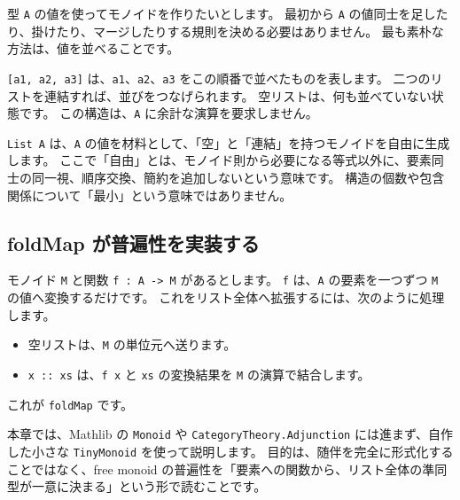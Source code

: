 型 \texttt{A} の値を使ってモノイドを作りたいとします。
最初から \texttt{A} の値同士を足したり、掛けたり、マージしたりする規則を決める必要はありません。
最も素朴な方法は、値を並べることです。

\texttt{[a1, a2, a3]} は、\texttt{a1}、\texttt{a2}、\texttt{a3} をこの順番で並べたものを表します。
二つのリストを連結すれば、並びをつなげられます。
空リストは、何も並べていない状態です。
この構造は、\texttt{A} に余計な演算を要求しません。

\texttt{List A} は、\texttt{A} の値を材料として、「空」と「連結」を持つモノイドを自由に生成します。
ここで「自由」とは、モノイド則から必要になる等式以外に、要素同士の同一視、順序交換、簡約を追加しないという意味です。
構造の個数や包含関係について「最小」という意味ではありません。


\subsection{foldMap が普遍性を実装する}

モノイド \texttt{M} と関数 \texttt{f : A -> M} があるとします。
\texttt{f} は、\texttt{A} の要素を一つずつ \texttt{M} の値へ変換するだけです。
これをリスト全体へ拡張するには、次のように処理します。

\begin{itemize}
\item 空リストは、\texttt{M} の単位元へ送ります。
\item \texttt{x :: xs} は、\texttt{f x} と \texttt{xs} の変換結果を \texttt{M} の演算で結合します。
\end{itemize}

これが \texttt{foldMap} です。

本章では、Mathlib の \texttt{Monoid} や \texttt{CategoryTheory.Adjunction} には進まず、自作した小さな \texttt{TinyMonoid} を使って説明します。
目的は、随伴を完全に形式化することではなく、free monoid の普遍性を「要素への関数から、リスト全体の準同型が一意に決まる」という形で読むことです。

